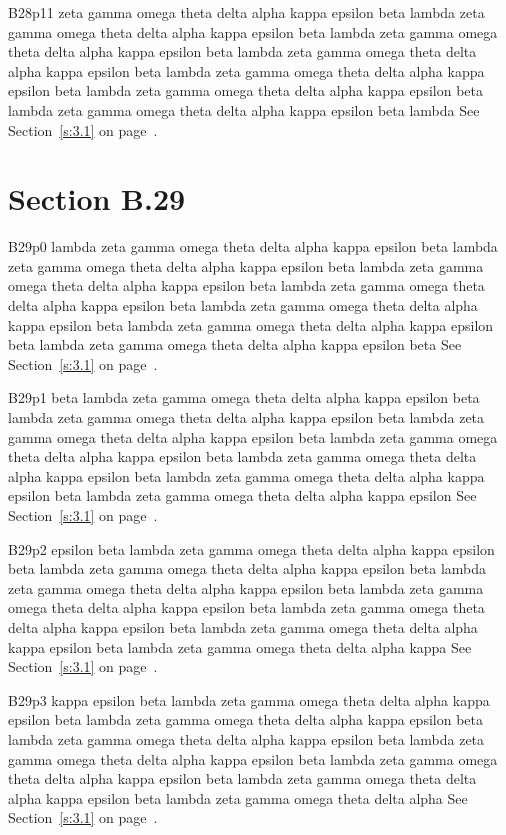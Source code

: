 B28p11 zeta gamma omega theta delta alpha kappa epsilon beta lambda zeta gamma omega theta delta alpha kappa epsilon beta lambda zeta gamma omega theta delta alpha kappa epsilon beta lambda zeta gamma omega theta delta alpha kappa epsilon beta lambda zeta gamma omega theta delta alpha kappa epsilon beta lambda zeta gamma omega theta delta alpha kappa epsilon beta lambda zeta gamma omega theta delta alpha kappa epsilon beta lambda See Section~\ref{s:3.1} on page~\pageref{s:3.1}.

\section{Section B.29}\label{s:B.29}
B29p0 lambda zeta gamma omega theta delta alpha kappa epsilon beta lambda zeta gamma omega theta delta alpha kappa epsilon beta lambda zeta gamma omega theta delta alpha kappa epsilon beta lambda zeta gamma omega theta delta alpha kappa epsilon beta lambda zeta gamma omega theta delta alpha kappa epsilon beta lambda zeta gamma omega theta delta alpha kappa epsilon beta lambda zeta gamma omega theta delta alpha kappa epsilon beta See Section~\ref{s:3.1} on page~\pageref{s:3.1}.

B29p1 beta lambda zeta gamma omega theta delta alpha kappa epsilon beta lambda zeta gamma omega theta delta alpha kappa epsilon beta lambda zeta gamma omega theta delta alpha kappa epsilon beta lambda zeta gamma omega theta delta alpha kappa epsilon beta lambda zeta gamma omega theta delta alpha kappa epsilon beta lambda zeta gamma omega theta delta alpha kappa epsilon beta lambda zeta gamma omega theta delta alpha kappa epsilon See Section~\ref{s:3.1} on page~\pageref{s:3.1}.

B29p2 epsilon beta lambda zeta gamma omega theta delta alpha kappa epsilon beta lambda zeta gamma omega theta delta alpha kappa epsilon beta lambda zeta gamma omega theta delta alpha kappa epsilon beta lambda zeta gamma omega theta delta alpha kappa epsilon beta lambda zeta gamma omega theta delta alpha kappa epsilon beta lambda zeta gamma omega theta delta alpha kappa epsilon beta lambda zeta gamma omega theta delta alpha kappa See Section~\ref{s:3.1} on page~\pageref{s:3.1}.

B29p3 kappa epsilon beta lambda zeta gamma omega theta delta alpha kappa epsilon beta lambda zeta gamma omega theta delta alpha kappa epsilon beta lambda zeta gamma omega theta delta alpha kappa epsilon beta lambda zeta gamma omega theta delta alpha kappa epsilon beta lambda zeta gamma omega theta delta alpha kappa epsilon beta lambda zeta gamma omega theta delta alpha kappa epsilon beta lambda zeta gamma omega theta delta alpha See Section~\ref{s:3.1} on page~\pageref{s:3.1}.

